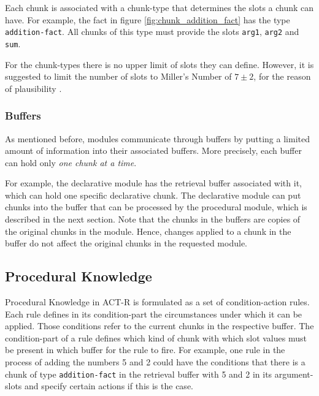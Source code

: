 Each chunk is associated with a chunk-type that determines the slots a chunk can have. For example, the fact in figure \ref{fig:chunk_addition_fact} has the type \verb|addition-fact|. All chunks of this type must provide the slots \verb|arg1|, \verb|arg2| and \verb|sum|.

\label{millers_number}
For the chunk-types there is no upper limit of slots they can define. However, it is suggested to limit the number of slots to Miller's Number of $7 \pm 2$, for the reason of plausibility \cite[230]{stewart_deconstructing_2007}. 

\subsubsection{Buffers}

As mentioned before, modules communicate through buffers by putting a limited amount of information into their associated buffers. More precisely, each buffer can hold only \emph{one chunk at a time}.

For example, the declarative module has the retrieval buffer associated with it, which can hold one specific declarative chunk. The declarative module can put chunks into the buffer that can be processed by the procedural module, which is described in the next section. Note that the chunks in the buffers are copies of the original chunks in the module. Hence, changes applied to a chunk in the buffer do not affect the original chunks in the requested module. 

\subsection{Procedural Knowledge}
\label{procedural_knowledge}

Procedural Knowledge in ACT-R is formulated as a set of condition-action rules. Each rule defines in its condition-part the circumstances under which it can be applied. Those conditions refer to the current chunks in the respective buffer. The condition-part of a rule defines which kind of chunk with which slot values must be present in which buffer for the rule to fire. For example, one rule in the process of adding the numbers 5 and 2 could have the conditions that there is a chunk of type \verb|addition-fact| in the retrieval buffer with 5 and 2 in its argument-slots and specify certain actions if this is the case.

